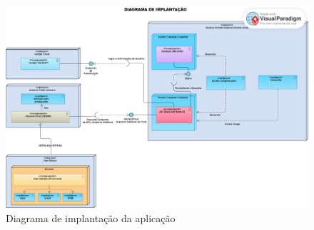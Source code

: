 \begin{figure}[htb]
  \centering
  \includegraphics[width=\textwidth]{cap04-desenvolvimento/images/4-3-2-2-diagrama-implantacao}
  \caption{Diagrama de implantação da aplicação}
  \label{fig:diagrama-implantacao}
\end{figure}
\FloatBarrier

